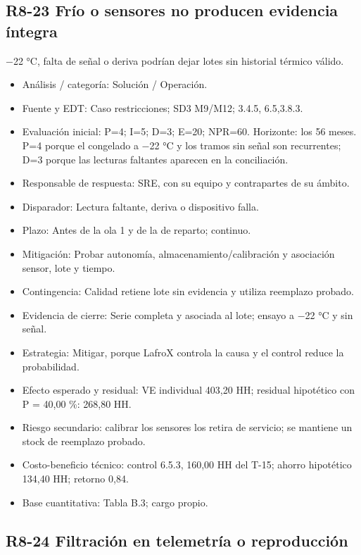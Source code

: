 \subsection*{R8-23 \textemdash{} Frío o sensores no producen evidencia íntegra}

\ensuremath{-}22 °C, falta de señal o deriva podrían dejar lotes sin historial térmico válido.

\begin{itemize}[leftmargin=*,itemsep=3pt]
\item Análisis / categoría: Solución / Operación.
\item Fuente y EDT: Caso restricciones; SD3 M9/M12; 3.4.5, 6.5,3.8.3.
\item Evaluación inicial: P=4; I=5; D=3; E=20; NPR=60. Horizonte: los 56 meses. P=4 porque el congelado a \ensuremath{-}22 °C y los tramos sin señal son recurrentes; D=3 porque las lecturas faltantes aparecen en la conciliación.
\item Responsable de respuesta: SRE, con su equipo y contrapartes de su ámbito.
\item Disparador: Lectura faltante, deriva o dispositivo falla.
\item Plazo: Antes de la ola 1 y de la de reparto; continuo.
\item Mitigación: Probar autonomía, almacenamiento/calibración y asociación sensor, lote y tiempo.
\item Contingencia: Calidad retiene lote sin evidencia y utiliza reemplazo probado.
\item Evidencia de cierre: Serie completa y asociada al lote; ensayo a \ensuremath{-}22 °C y sin señal.
\item Estrategia: Mitigar, porque LafroX controla la causa y el control reduce la probabilidad.
\item Efecto esperado y residual: VE individual 403,20 HH; residual hipotético con P = 40,00 \%: 268,80 HH.
\item Riesgo secundario: calibrar los sensores los retira de servicio; se mantiene un stock de reemplazo probado.
\item Costo-beneficio técnico: control 6.5.3, 160,00 HH del T-15; ahorro hipotético 134,40 HH; retorno 0,84.
\item Base cuantitativa: Tabla B.3; cargo propio.
\end{itemize}

\subsection*{R8-24 \textemdash{} Filtración en telemetría o reproducción}

